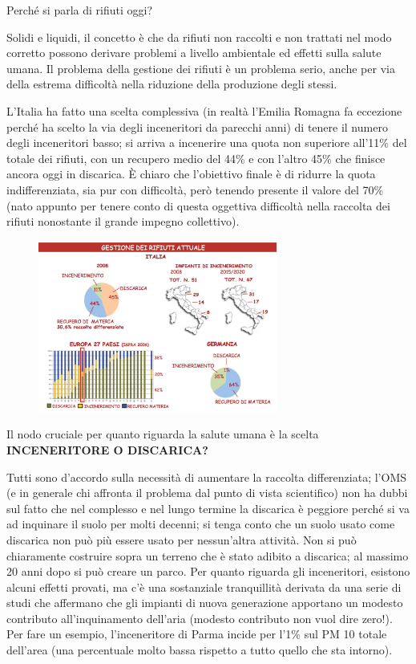 Perché si parla di rifiuti oggi?

Solidi e liquidi, il concetto è che da rifiuti non raccolti e non
trattati nel modo corretto possono derivare problemi a livello
ambientale ed effetti sulla salute umana. Il problema della gestione dei
rifiuti è un problema serio, anche per via della estrema difficoltà
nella riduzione della produzione degli stessi.

L'Italia ha fatto una scelta complessiva (in realtà l'Emilia Romagna fa
eccezione perché ha scelto la via degli inceneritori da parecchi anni)
di tenere il numero degli inceneritori basso; si arriva a incenerire una
quota non superiore all'11\% del totale dei rifiuti, con un recupero
medio del 44\% e con l'altro 45\% che finisce ancora oggi in discarica.
È chiaro che l'obiettivo finale è di ridurre la quota indifferenziata,
sia pur con difficoltà, però tenendo presente il valore del 70\% (nato
appunto per tenere conto di questa oggettiva difficoltà nella raccolta
dei rifiuti nonostante il grande impegno collettivo).

\begin{figure}[!ht]
\centering
	\includegraphics[width=0.7\textwidth]{23/image15.jpg}
	\end{figure}

Il nodo cruciale per quanto riguarda la salute umana è la scelta
\textbf{INCENERITORE O DISCARICA?}

Tutti sono d'accordo sulla necessità di aumentare la raccolta
differenziata; l'OMS (e in generale chi affronta il problema dal punto
di vista scientifico) non ha dubbi sul fatto che nel complesso e nel
lungo termine la discarica è peggiore perché si va ad inquinare il suolo
per molti decenni; si tenga conto che un suolo usato come discarica non
può più essere usato per nessun'altra attività. Non si può chiaramente
costruire sopra un terreno che è stato adibito a discarica; al massimo
20 anni dopo si può creare un parco. Per quanto riguarda gli
inceneritori, esistono alcuni effetti provati, ma c'è una sostanziale
tranquillità derivata da una serie di studi che affermano che gli
impianti di nuova generazione apportano un modesto contributo
all'inquinamento dell'aria (modesto contributo non vuol dire zero!). Per
fare un esempio, l'inceneritore di Parma incide per l'1\% sul PM 10
totale dell'area (una percentuale molto bassa rispetto a tutto quello
che sta intorno).

